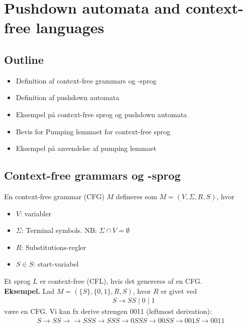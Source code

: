 \section{Pushdown automata and context-free languages}

\subsection*{Outline}
\begin{itemize}
	\item Definition af context-free grammars og -sprog
	\item Definition af pushdown automata 
	\item Eksempel på context-free sprog og pushdown automata
	\item Bevis for Pumping lemmaet for context-free sprog
	\item Eksempel på anvendelse af pumping lemmaet
\end{itemize}

\subsection*{Context-free grammars og -sprog}

En context-free grammar (CFG) $M$ defineres som $M=(V, \Sigma, R, S)$, hvor 
\begin{itemize}
	\item $V$: variabler
	\item $\Sigma$: Terminal symbols. NB: $\Sigma \cap V = \emptyset$ 
	\item $R$: Substitutions-regler
	\item $S \in S$: start-variabel 
\end{itemize}

Et sprog $L$ er context-free (CFL), hvis det genereres af en CFG. \\

\textbf{Eksempel.} Lad $M=(\{S\}, \{0,1\},R, S)$, hvor $R$ er givet ved
\begin{align*}
	&S \rightarrow SS \; | \; 0 \; | \; 1
\end{align*}
være en CFG. Vi kan fx derive strengen 0011 (leftmost derivation): 
\begin{align*}
S \rightarrow SS \rightarrow \rightarrow SSS \rightarrow SSS \rightarrow 0SSS \rightarrow 00SS \rightarrow 001S \rightarrow 0011
\end{align*}

